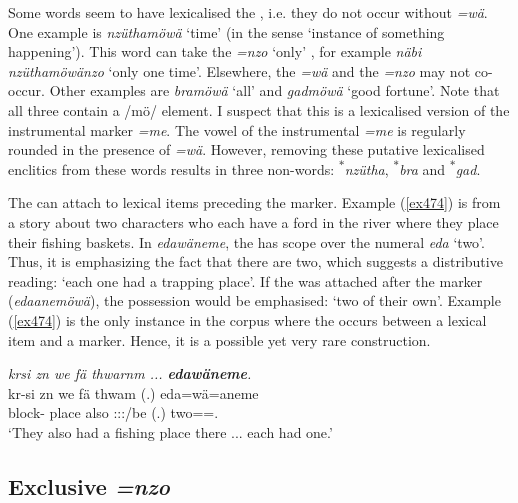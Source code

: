 Some words seem to have lexicalised the  , i.e. they do not occur without \emph{=wä}. One example is \emph{nzüthamöwä} `time' (in the sense `instance of something happening'). This word can take the \emph{=nzo} `only' , for example \emph{näbi nzüthamöwänzo} `only one time'. Elsewhere, the   \emph{=wä} and the   \emph{=nzo} may not co-occur. Other examples are \emph{bramöwä} `all' and \emph{gadmöwä} `good fortune'. Note that all three contain a /mö/ element. I suspect that this is a lexicalised version of the instrumental  marker \emph{=me}. The vowel of the instrumental \emph{=me} is regularly rounded in the presence of \emph{=wä}. However, removing these putative lexicalised enclitics from these words results in three non-words: \textsuperscript{$\ast$}\emph{nzütha}, \textsuperscript{$\ast$}\emph{bra} and \textsuperscript{$\ast$}\emph{gad}.
	
The   can attach to lexical items preceding the  marker. Example (\ref{ex474}) is from a story about two characters who each have a ford in the river where they place their fishing baskets. In \emph{edawäneme}, the  has scope over the numeral \emph{eda} `two'. Thus, it is emphasizing the fact that there are two, which suggests a distributive reading: `each one had a trapping place'. If the  was attached after the  marker (\emph{edaanemöwä}), the possession would be emphasised: `two of their own'. Example (\ref{ex474}) is the only instance in the corpus where the   occurs between a lexical item and a  marker. Hence, it is a possible yet very rare construction. 
 
\begin{exe}
	\ex \emph{krsi zn we fä thwarnm ... \textbf{edawäneme}.}\\
	\gll kr-si zn we fä thwam (.) eda=wä=aneme\\
	block-{\Nmlz} place also {\Dist} \Stdu:\Io:\Pst:\Dur/be (.) two=\Emph=\Poss.{\Nsg}\\
	\trans `They also had a fishing place there ... each had one.'
	\label{ex474}
\end{exe}

\subsection{Exclusive \emph{=nzo}} \label{exclusivenzo}

